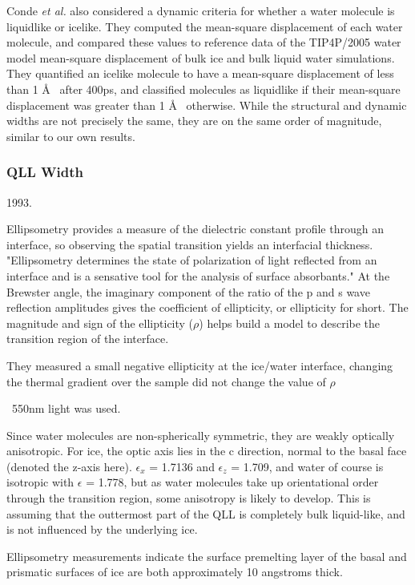 Conde \textit{et al.} also considered a dynamic criteria for whether a
water molecule is liquidlike or icelike. They computed the mean-square
displacement of each water molecule, and compared these values to
reference data of the TIP4P/2005 water model mean-square displacement
of bulk ice and bulk liquid water simulations. They quantified an
icelike molecule to have a mean-square displacement of less than 1
\AA~ after 400ps, and classified molecules as liquidlike if their
mean-square displacement was greater than 1 \AA~ otherwise. While the
structural and dynamic widths are not precisely the same, they are on
the same order of magnitude, similar to our own results. 


\subsubsection{QLL Width}
%
%
1993.

Ellipsometry provides a measure of the dielectric constant profile through an interface, so observing the spatial transition yields an interfacial thickness. "Ellipsometry determines the state of polarization of light reflected from an interface and is a sensative tool for the analysis of surface absorbants." At the Brewster angle, the imaginary component of the ratio of the p and s wave reflection amplitudes gives the coefficient of ellipticity, or ellipticity for short. The magnitude and sign of the ellipticity ($\rho$) helps build a model to describe the transition region of the interface.

They measured a small negative ellipticity at the ice/water interface, changing the thermal gradient over the sample did not change the value of $\rho$  

~550nm light was used.

Since water molecules are non-spherically symmetric, they are weakly
optically anisotropic. For ice, the optic axis lies in the c
direction, normal to the basal face (denoted the z-axis
here). $\epsilon_{x}$ = 1.7136 and $\epsilon_{z}$ = 1.709, and water
of course is isotropic with $\epsilon$ = 1.778, but as water molecules
take up orientational order through the transition region, some
anisotropy is likely to develop. This is assuming that the outtermost
part of the QLL is completely bulk liquid-like, and is not influenced
by the underlying ice.

Ellipsometry measurements indicate the surface premelting layer of the basal and prismatic surfaces of ice are both approximately 10 angstroms thick.

